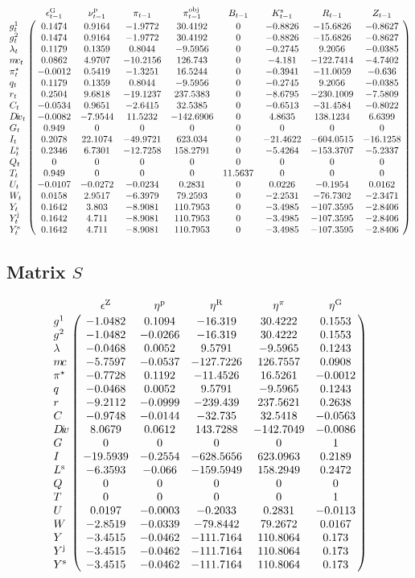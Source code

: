 $$\bordermatrix{
~ & \epsilon^{\mathrm{G}}_{t-1} & \nu^{\mathrm{p}}_{t-1} & \pi_{t-1} & \pi^{\mathrm{obj}}_{t-1} & B_{t-1} & K^{\mathrm{s}}_{t-1} & R_{t-1} & Z_{t-1} \cr
g^{\mathrm{1}}_{t} & 0.1474 & 0.9164 & -1.9772 & 30.4192 & 0 & -0.8826 & -15.6826 & -0.8627 \cr
g^{\mathrm{2}}_{t} & 0.1474 & 0.9164 & -1.9772 & 30.4192 & 0 & -0.8826 & -15.6826 & -0.8627 \cr
\lambda_{t} & 0.1179 & 0.1359 & 0.8044 & -9.5956 & 0 & -0.2745 & 9.2056 & -0.0385 \cr
{m\!c}_{t} & 0.0862 & 4.9707 & -10.2156 & 126.743 & 0 & -4.181 & -122.7414 & -4.7402 \cr
\pi^{\star}_{t} & -0.0012 & 0.5419 & -1.3251 & 16.5244 & 0 & -0.3941 & -11.0059 & -0.636 \cr
q_{t} & 0.1179 & 0.1359 & 0.8044 & -9.5956 & 0 & -0.2745 & 9.2056 & -0.0385 \cr
r_{t} & 0.2504 & 9.6818 & -19.1237 & 237.5383 & 0 & -8.6795 & -230.1009 & -7.5809 \cr
C_{t} & -0.0534 & 0.9651 & -2.6415 & 32.5385 & 0 & -0.6513 & -31.4584 & -0.8022 \cr
{D\!i\!v}_{t} & -0.0082 & -7.9544 & 11.5232 & -142.6906 & 0 & 4.8635 & 138.1234 & 6.6399 \cr
G_{t} & 0.949 & 0 & 0 & 0 & 0 & 0 & 0 & 0 \cr
I_{t} & 0.2078 & 22.1074 & -49.9721 & 623.034 & 0 & -21.4622 & -604.0515 & -16.1258 \cr
L^{\mathrm{s}}_{t} & 0.2346 & 6.7301 & -12.7258 & 158.2791 & 0 & -5.4264 & -153.3707 & -5.2337 \cr
Q_{t} & 0 & 0 & 0 & 0 & 0 & 0 & 0 & 0 \cr
T_{t} & 0.949 & 0 & 0 & 0 & 11.5637 & 0 & 0 & 0 \cr
U_{t} & -0.0107 & -0.0272 & -0.0234 & 0.2831 & 0 & 0.0226 & -0.1954 & 0.0162 \cr
W_{t} & 0.0158 & 2.9517 & -6.3979 & 79.2593 & 0 & -2.2531 & -76.7302 & -2.3471 \cr
Y_{t} & 0.1642 & 3.803 & -8.9081 & 110.7953 & 0 & -3.4985 & -107.3595 & -2.8406 \cr
Y^{\mathrm{j}}_{t} & 0.1642 & 4.711 & -8.9081 & 110.7953 & 0 & -3.4985 & -107.3595 & -2.8406 \cr
Y^{\mathrm{s}}_{t} & 0.1642 & 4.711 & -8.9081 & 110.7953 & 0 & -3.4985 & -107.3595 & -2.8406 \cr
}$$

\subsection*{Matrix $S$}

$$\bordermatrix{
~ & \epsilon^{\mathrm{Z}} & \eta^{\mathrm{p}} & \eta^{\mathrm{R}} & \eta^{\pi} & \eta^{\mathrm{G}} \cr
g^{\mathrm{1}} & -1.0482 & 0.1094 & -16.319 & 30.4222 & 0.1553 \cr
g^{\mathrm{2}} & -1.0482 & -0.0266 & -16.319 & 30.4222 & 0.1553 \cr
\lambda & -0.0468 & 0.0052 & 9.5791 & -9.5965 & 0.1243 \cr
{m\!c} & -5.7597 & -0.0537 & -127.7226 & 126.7557 & 0.0908 \cr
\pi^{\star} & -0.7728 & 0.1192 & -11.4526 & 16.5261 & -0.0012 \cr
q & -0.0468 & 0.0052 & 9.5791 & -9.5965 & 0.1243 \cr
r & -9.2112 & -0.0999 & -239.439 & 237.5621 & 0.2638 \cr
C & -0.9748 & -0.0144 & -32.735 & 32.5418 & -0.0563 \cr
{D\!i\!v} & 8.0679 & 0.0612 & 143.7288 & -142.7049 & -0.0086 \cr
G & 0 & 0 & 0 & 0 & 1 \cr
I & -19.5939 & -0.2554 & -628.5656 & 623.0963 & 0.2189 \cr
L^{\mathrm{s}} & -6.3593 & -0.066 & -159.5949 & 158.2949 & 0.2472 \cr
Q & 0 & 0 & 0 & 0 & 0 \cr
T & 0 & 0 & 0 & 0 & 1 \cr
U & 0.0197 & -0.0003 & -0.2033 & 0.2831 & -0.0113 \cr
W & -2.8519 & -0.0339 & -79.8442 & 79.2672 & 0.0167 \cr
Y & -3.4515 & -0.0462 & -111.7164 & 110.8064 & 0.173 \cr
Y^{\mathrm{j}} & -3.4515 & -0.0462 & -111.7164 & 110.8064 & 0.173 \cr
Y^{\mathrm{s}} & -3.4515 & -0.0462 & -111.7164 & 110.8064 & 0.173 \cr
}$$


